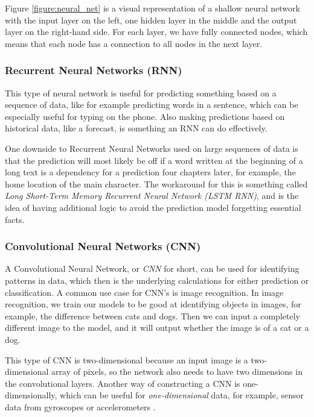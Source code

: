 Figure \ref{figure:neural_net} is a visual representation of a shallow neural network with the input layer on the left, one hidden layer in the middle and the output layer on the right-hand side. For each layer, we have fully connected nodes, which means that each node has a connection to all nodes in the next layer.

\subsubsection{Recurrent Neural Networks (RNN)}
This type of neural network is useful for predicting something based on a sequence of data, like for example predicting words in a sentence, which can be especially useful for typing on the phone. Also making predictions based on historical data, like a forecast, is something an RNN can do effectively.

One downside to Recurrent Neural Networks used on large sequences of data is that the prediction will most likely be off if a word written at the beginning of a long text is a dependency for a prediction four chapters later, for example, the home location of the main character. The workaround for this is something called \textit{Long Short-Term Memory Recurrent Neural Network (LSTM RNN)}, and is the idea of having additional logic to avoid the prediction model forgetting essential facts.

\subsubsection{Convolutional Neural Networks (CNN)}
A Convolutional Neural Network, or \textit{CNN} for short, can be used for identifying patterns in data, which then is the underlying calculations for either prediction or classification. A common use case for CNN's is image recognition. In image recognition, we train our models to be good at identifying objects in images, for example, the difference between cats and dogs. Then we can input a completely different image to the model, and it will output whether the image is of a cat or a dog. 

This type of CNN is two-dimensional because an input image is a two-dimensional array of pixels, so the network also needs to have two dimensions in the convolutional layers. Another way of constructing a CNN is one-dimensionally, which can be useful for \textit{one-dimensional} data, for example, sensor data from gyroscopes or accelerometers \cite{1d_cnn}.


